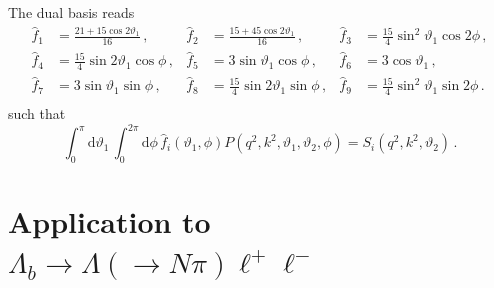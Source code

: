 \documentclass[aps,prd,reprint,nofootinbib,preprintnumbers]{revtex4}
\newcommand{\rmdx}[1]{\mbox{d} #1 \,} %
\renewcommand{\theta}{\vartheta}
\begin{document}
The dual basis reads
\begin{equation}
\begin{aligned}
    \hat{f}_1 & = \frac{21 + 15 \cos 2\theta_1}{16}\,, &
    \hat{f}_2 & = \frac{15 + 45 \cos 2\theta_1}{16}\,, &
    \hat{f}_3 & = \frac{15}{4} \sin^2\theta_1 \cos 2\phi     \,,\\
    \hat{f}_4 & = \frac{15}{4} \sin 2\theta_1 \cos  \phi     \,, &
    \hat{f}_5 & = 3            \sin  \theta_1 \cos  \phi     \,, &
    \hat{f}_6 & = 3 \cos\theta_1                   \,,\\
    \hat{f}_7 & = 3            \sin  \theta_1 \sin  \phi     \,, &
    \hat{f}_8 & = \frac{15}{4} \sin 2\theta_1 \sin  \phi     \,, &
    \hat{f}_9 & = \frac{15}{4} \sin^2\theta_1 \sin 2\phi     \,.\\
\end{aligned}
\end{equation}
such that
\begin{equation}
    \int_0^\pi \rmdx{\theta_1} \int_0^{2\pi} \rmdx{\phi} \hat{f}_i(\theta_1,\phi) P(q^2, k^2, \theta_1,\theta_2,\phi) = S_i(q^2, k^2, \theta_2)\,.
\end{equation}


\section{Application to $\Lambda_b\to \Lambda(\to N \pi)\ell^+\ell^-$}
\label{app:lambdabtolambdall}
\end{document}
